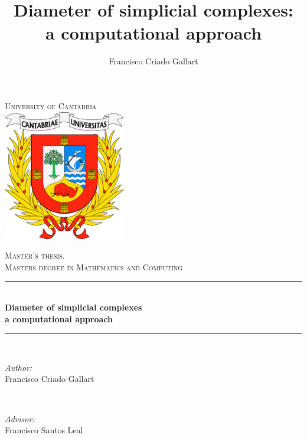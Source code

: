 \documentclass[12pt,a4paper]{article}
\title{ Diameter of simplicial complexes: \\ a computational approach}
\author{Francisco Criado Gallart}
\date{}
\theoremstyle{plain}
\theoremstyle{definition}
\begin{document}

\setlength{\parindent}{4ex}

\thispagestyle{plain}

\begin{titlepage}

\newcommand{\HRule}{\rule{\linewidth}{0.5mm}} %

\center %
 

\textsc{\LARGE University of Cantabria}\\[1.5cm] %

\includegraphics[width=0.4\textwidth]{img/logo_UC.png}

\textsc{\Large Master's thesis.}\\[0.5cm] %
\textsc{\large Masters degree in Mathematics and Computing}\\[0.5cm] %


\HRule \\[0.4cm]
{ \huge \bfseries Diameter of simplicial complexes \\ a computational approach}\\[0.4cm] %
\HRule \\[1.5cm]
 


\begin{minipage}{0.4\textwidth}
\begin{flushleft} \large
\emph{Author:}\\
Francisco Criado Gallart  %
\end{flushleft}
\end{minipage}
~
\begin{minipage}{0.5\textwidth}
\begin{flushright} \large
\emph{Advisor:} \\
Francisco Santos Leal %
\end{flushright}
\end{minipage}\\[4cm]


\end{titlepage}
\end{document}
